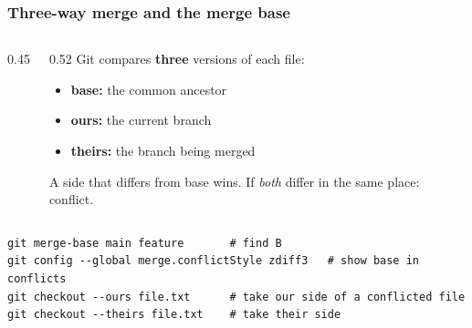\documentclass[aspectratio=169,10pt,compress]{beamer}
\begin{document}
\begin{frame}[t,fragile] \frametitle{Three-way merge and the merge base}
  \begin{columns}[T]
    \begin{column}{0.45\textwidth}
      \centering
    \end{column}
    \begin{column}{0.52\textwidth}
      \small
      Git compares \textbf{three} versions of each file:
      \begin{itemize}
        \item \textbf{base:} the common ancestor
        \item \textbf{ours:} the current branch
        \item \textbf{theirs:} the branch being merged
      \end{itemize}
      A side that differs from base wins. If \emph{both} differ in the same place: conflict.
    \end{column}
  \end{columns}

\begin{lstlisting}
git merge-base main feature       # find B
git config --global merge.conflictStyle zdiff3   # show base in conflicts
git checkout --ours file.txt      # take our side of a conflicted file
git checkout --theirs file.txt    # take their side
\end{lstlisting}
\end{frame}
\end{document}
